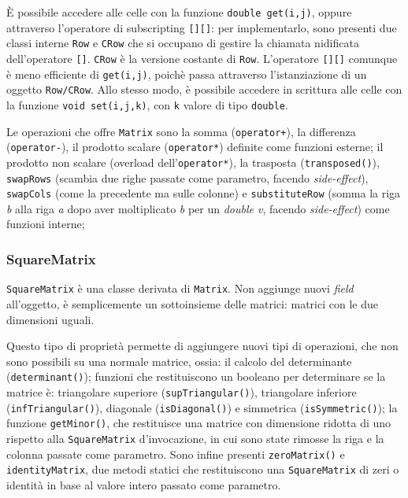 È possibile accedere alle celle con la funzione \texttt{double get(i,j)}, 
oppure attraverso l'operatore di subscripting \texttt{[][]}: per implementarlo, sono presenti due classi interne
\texttt{Row} e \texttt{CRow} che si occupano di gestire la chiamata nidificata dell'operatore 
\texttt{[]}. \texttt{CRow} è la versione costante di \texttt{Row}. L'operatore \texttt{[][]} comunque è meno
efficiente di \texttt{get(i,j)}, poichè passa attraverso l'istanziazione di un oggetto \texttt{Row/CRow}.
Allo stesso modo, è possibile accedere in scrittura alle celle con la funzione \mbox{\texttt{void set(i,j,k)}}, con 
\texttt{k} valore di tipo \texttt{double}.

Le operazioni che offre \texttt{Matrix} sono
la somma (\texttt{operator+}), la differenza (\texttt{operator-}), il prodotto scalare (\texttt{operator*})
definite come funzioni esterne; il prodotto non scalare (overload dell'\texttt{operator*}), la trasposta (\texttt{transposed()}), \texttt{swapRows} 
(scambia due righe passate come parametro, facendo \emph{side-effect}), \texttt{swapCols} (come la precedente 
ma sulle colonne) e \texttt{substituteRow} (somma la riga \emph{b} alla riga \emph{a} dopo aver moltiplicato 
\emph{b} per un \emph{double v}, facendo \emph{side-effect}) come funzioni interne;

\subsubsection{SquareMatrix} 
\texttt{SquareMatrix} è una classe derivata di \texttt{Matrix}. Non aggiunge nuovi \emph{field} all'oggetto,
è semplicemente un sottoinsieme delle matrici: matrici con le due dimensioni uguali.\par
Questo tipo di proprietà permette di aggiungere nuovi tipi di operazioni, che non sono possibili su una
normale matrice, ossia: il calcolo del determinante (\texttt{determinant()}); funzioni che restituiscono un 
booleano per determinare se la matrice è: triangolare superiore (\texttt{supTriangular()}), triangolare 
inferiore (\texttt{infTriangular()}), diagonale (\texttt{isDiagonal()}) e simmetrica (\texttt{isSymmetric()});
la funzione \texttt{getMinor()}, che restituisce una matrice con dimensione ridotta di uno rispetto alla 
\texttt{SquareMatrix} d'invocazione, in cui sono state rimosse la riga e la colonna passate come parametro. Sono infine presenti
\texttt{zeroMatrix()} e \texttt{identityMatrix}, due metodi statici che restituiscono una \texttt{SquareMatrix} di zeri o identità in 
base al valore intero passato come parametro.


